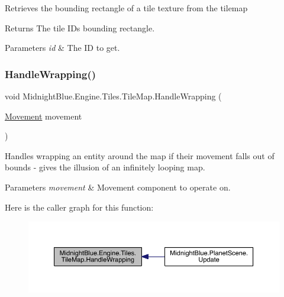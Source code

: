 Retrieves the bounding rectangle of a tile texture from the tilemap 

\begin{DoxyReturn}{Returns}
The tile ID\textquotesingle{}s bounding rectangle.
\end{DoxyReturn}

\begin{DoxyParams}{Parameters}
{\em id} & The ID to get.\\
\hline
\end{DoxyParams}
\hypertarget{class_midnight_blue_1_1_engine_1_1_tiles_1_1_tile_map_a503a61faaa4edd93bfa18258785726ec}{}\label{class_midnight_blue_1_1_engine_1_1_tiles_1_1_tile_map_a503a61faaa4edd93bfa18258785726ec} 
\subsubsection{\texorpdfstring{Handle\+Wrapping()}{HandleWrapping()}}
{\footnotesize\ttfamily void Midnight\+Blue.\+Engine.\+Tiles.\+Tile\+Map.\+Handle\+Wrapping (\begin{DoxyParamCaption}\item[{\hyperlink{class_midnight_blue_1_1_engine_1_1_entity_component_1_1_movement}{Movement}}]{movement }\end{DoxyParamCaption})\hspace{0.3cm}{\ttfamily [inline]}}



Handles wrapping an entity around the map if their movement falls out of bounds -\/ gives the illusion of an infinitely looping map. 


\begin{DoxyParams}{Parameters}
{\em movement} & Movement component to operate on.\\
\hline
\end{DoxyParams}
Here is the caller graph for this function\+:
\nopagebreak
\begin{figure}[H]
\begin{center}
\leavevmode
\includegraphics[width=350pt]{class_midnight_blue_1_1_engine_1_1_tiles_1_1_tile_map_a503a61faaa4edd93bfa18258785726ec_icgraph}
\end{center}
\end{figure}


